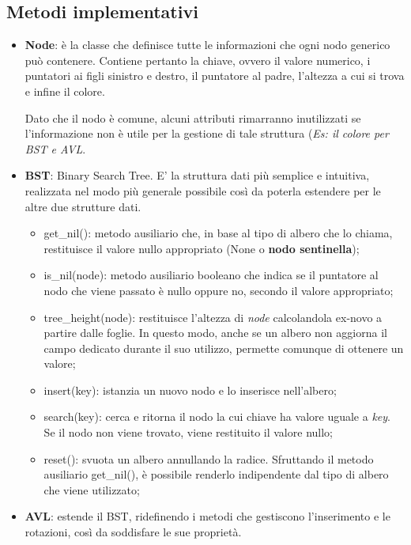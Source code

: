 \documentclass{article}
\begin{document}
\subsection{Metodi implementativi}
\begin{itemize}
    \item \textbf{Node}: è la classe che definisce tutte le informazioni che ogni nodo generico può contenere. Contiene pertanto la chiave, ovvero il valore numerico, i puntatori ai figli sinistro e destro, il puntatore al padre, l'altezza a cui si trova e infine il colore.

    Dato che il nodo è comune, alcuni attributi rimarranno inutilizzati se l'informazione non è utile per la gestione di tale struttura (\textit{Es: il colore per BST e AVL}.
    \item \textbf{BST}: Binary Search Tree. E' la struttura dati più semplice e intuitiva, realizzata nel modo più generale possibile così da poterla estendere per le altre due strutture dati.
    \begin{itemize}
        \item get\_nil(): metodo ausiliario che, in base al tipo di albero che lo chiama, restituisce il valore nullo appropriato (None o \textbf{nodo sentinella});
        \item is\_nil(node): metodo ausiliario booleano che indica se il puntatore al nodo che viene passato è nullo oppure no, secondo il valore appropriato;
        \item tree\_height(node): restituisce l'altezza di \textit{node} calcolandola ex-novo a partire dalle foglie. In questo modo, anche se un albero non aggiorna il campo dedicato durante il suo utilizzo, permette comunque di ottenere un valore;
        \item insert(key): istanzia un nuovo nodo e lo inserisce nell'albero;
        \item search(key): cerca e ritorna il nodo la cui chiave ha valore uguale a \textit{key}. Se il nodo non viene trovato, viene restituito il valore nullo;
        \item reset(): svuota un albero annullando la radice. Sfruttando il metodo ausiliario get\_nil(), è possibile renderlo indipendente dal tipo di albero che viene utilizzato;
    \end{itemize}
    \item \textbf{AVL}: estende il BST, ridefinendo i metodi che gestiscono l'inserimento e le rotazioni, così da soddisfare le sue proprietà.
    \begin{itemize}

\end{itemize}
\end{itemize}
\end{document}
